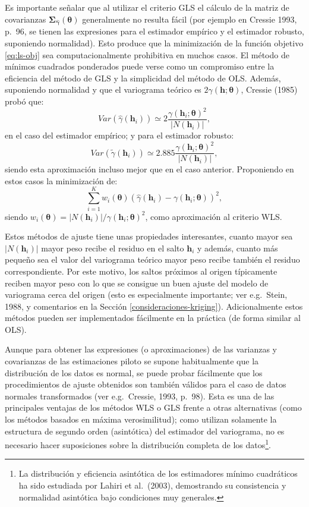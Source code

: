 \documentclass[
  spanish,
]{book}
\theoremstyle{break}
\theoremstyle{definition}
\theoremstyle{definition}
\theoremstyle{definition}
\theoremstyle{definition}
\theoremstyle{remark}
\begin{document}
Es importante señalar que al utilizar el criterio GLS el cálculo de la matriz de covarianzas \(\boldsymbol{\Sigma}_{\hat{\boldsymbol{\gamma}}} (\boldsymbol{\theta})\) generalmente no resulta fácil (por ejemplo en Cressie 1993, p.~96, se tienen las expresiones para el estimador empírico y el estimador robusto, suponiendo normalidad).
Esto produce que la minimización de la función objetivo \eqref{eq:ls-obj} sea computacionalmente prohibitiva en muchos casos.
El método de mínimos cuadrados ponderados puede verse como un compromiso entre la eficiencia del método de GLS y la simplicidad del método de OLS.
Además, suponiendo normalidad y que el variograma teórico es \(2\gamma(\mathbf{h};\boldsymbol{\theta})\), Cressie (1985) probó que:
\[Var(\hat{\gamma}(\mathbf{h}_{i}))\simeq 2\dfrac{\gamma(\mathbf{h}_{i}
;\boldsymbol{\theta})^2 }{\left| N(\mathbf{h}_{i})\right| },\]
en el caso del estimador empírico; y para el estimador robusto:
\[Var(\tilde{\gamma}(\mathbf{h}_{i}))\simeq 2.885\dfrac{\gamma
(\mathbf{h}_{i} ;\boldsymbol{\theta})^2 }{\left| N(\mathbf{h}_{i})\right| },\]
siendo esta aproximación incluso mejor que en el caso anterior.
Proponiendo en estos casos la minimización de:
\[\sum\limits_{i=1}^{K} w_{i}(\boldsymbol{\theta}) \left( \hat{\gamma}(\mathbf{h}_{i}) - \gamma(\mathbf{h}_{i};\boldsymbol{\theta}) \right)^2,\]
siendo \(w_{i}(\boldsymbol{\theta}) = \left| N(\mathbf{h}_{i})\right| /\gamma(\mathbf{h}_{i} ;\boldsymbol{\theta})^2\), como aproximación al criterio WLS.

Estos métodos de ajuste tiene unas propiedades interesantes, cuanto mayor sea \(\left| N(\mathbf{h}_{i})\right|\) mayor peso recibe el residuo en el salto \(\mathbf{h}_{i}\) y además, cuanto más pequeño sea el valor del variograma teórico mayor peso recibe también el residuo correspondiente.
Por este motivo, los saltos próximos al origen típicamente reciben mayor peso con lo que se consigue un buen ajuste del modelo de variograma cerca del origen (esto es especialmente importante; ver e.g.~Stein, 1988, y comentarios en la Sección \ref{consideraciones-kriging}).
Adicionalmente estos métodos pueden ser implementados fácilmente en la práctica (de forma similar al OLS).

Aunque para obtener las expresiones (o aproximaciones) de las varianzas y covarianzas de las estimaciones piloto se supone habitualmente que la distribución de los datos es normal, se puede probar fácilmente que los procedimientos de ajuste obtenidos son también válidos para el caso de datos normales transformados (ver e.g.~Cressie, 1993, p.~98).
Esta es una de las principales ventajas de los métodos WLS o GLS frente a otras alternativas (como los métodos basados en máxima verosimilitud); como utilizan solamente la estructura de segundo orden (asintótica) del estimador del variograma, no es necesario hacer suposiciones sobre la distribución completa de los datos\footnote{La distribución y eficiencia asintótica de los estimadores mínimo cuadráticos ha sido estudiada por Lahiri et al.~(2003), demostrando su consistencia y normalidad asintótica bajo condiciones muy generales.}.
\end{document}
